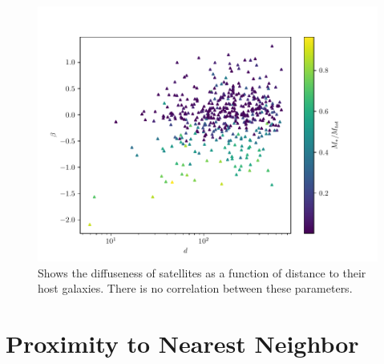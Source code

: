 \begin{figure}
    \centering
    \includegraphics*[width=\textwidth*2/3]{figs/me/beta-d.pdf}
    \caption{
        Shows the diffuseness of satellites as a function of distance to their host galaxies. There is no correlation between these parameters.
    }
    \label{fig:beta-d}
\end{figure}


\section{Proximity to Nearest Neighbor}

